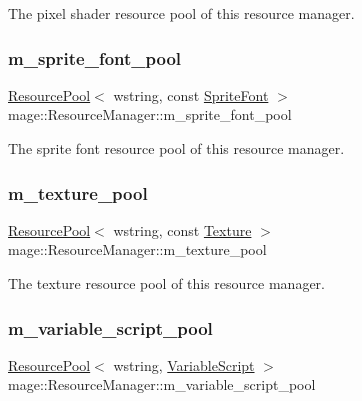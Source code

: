 The pixel shader resource pool of this resource manager. \hypertarget{classmage_1_1_resource_manager_a258659adedbd3aa060bb8c7b77c08995}{}\label{classmage_1_1_resource_manager_a258659adedbd3aa060bb8c7b77c08995} 
\subsubsection{\texorpdfstring{m\+\_\+sprite\+\_\+font\+\_\+pool}{m\_sprite\_font\_pool}}
{\footnotesize\ttfamily \hyperlink{classmage_1_1_resource_pool}{Resource\+Pool}$<$ wstring, const \hyperlink{classmage_1_1_sprite_font}{Sprite\+Font} $>$ mage\+::\+Resource\+Manager\+::m\+\_\+sprite\+\_\+font\+\_\+pool\hspace{0.3cm}{\ttfamily [private]}}

The sprite font resource pool of this resource manager. \hypertarget{classmage_1_1_resource_manager_afd1a86759068e33e06df595ac0fd212c}{}\label{classmage_1_1_resource_manager_afd1a86759068e33e06df595ac0fd212c} 
\subsubsection{\texorpdfstring{m\+\_\+texture\+\_\+pool}{m\_texture\_pool}}
{\footnotesize\ttfamily \hyperlink{classmage_1_1_resource_pool}{Resource\+Pool}$<$ wstring, const \hyperlink{classmage_1_1_texture}{Texture} $>$ mage\+::\+Resource\+Manager\+::m\+\_\+texture\+\_\+pool\hspace{0.3cm}{\ttfamily [private]}}

The texture resource pool of this resource manager. \hypertarget{classmage_1_1_resource_manager_a0da21bf8c511af4238cd1be0f7f7d31d}{}\label{classmage_1_1_resource_manager_a0da21bf8c511af4238cd1be0f7f7d31d} 
\subsubsection{\texorpdfstring{m\+\_\+variable\+\_\+script\+\_\+pool}{m\_variable\_script\_pool}}
{\footnotesize\ttfamily \hyperlink{classmage_1_1_resource_pool}{Resource\+Pool}$<$ wstring, \hyperlink{classmage_1_1_variable_script}{Variable\+Script} $>$ mage\+::\+Resource\+Manager\+::m\+\_\+variable\+\_\+script\+\_\+pool\hspace{0.3cm}{\ttfamily [private]}}

